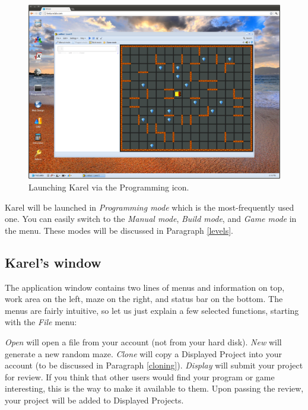 \documentclass[article,A4,12pt]{llncs}
\begin{document}
\begin{figure}[!ht]
\begin{center}
\includegraphics[width=\textwidth]{img/init.png}
\end{center}
\vspace{-2mm}
\caption{Launching Karel via the Programming icon.}
\label{fig:init}
\end{figure}
\noindent
Karel will be launched in {\em Programming mode} which is the most-frequently 
used one. You can easily switch to the {\em Manual mode}, {\em Build mode},
and {\em Game mode} in the menu. These modes will be discussed in Paragraph 
\ref{levels}.

\subsection{Karel's window} \label{menu}

The application window contains two lines of menus and information on top,
work area on the left, maze on the right, and status bar on the bottom.
The menus are fairly intuitive, so let us just explain a few selected 
functions, starting with the {\em File} menu:

{\em Open} will open a file from your account (not from your hard disk). {\em New} will generate a new random maze.
{\em Clone} will copy a Displayed Project into your account (to be discussed in Paragraph \ref{cloning}). 
{\em Display} will submit your project for review. If you think that 
      other users would find your program or game interesting, this is the way to make it 
      available to them. Upon passing the review, your project will be added to Displayed Projects.
\end{document}
